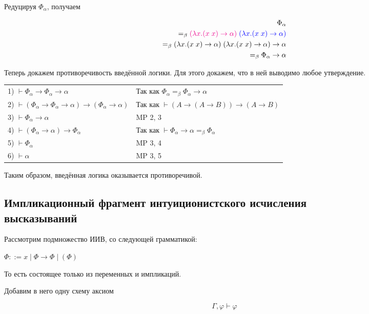 Редуцируя $\Phi_{\alpha}$, получаем 

\begin{align*}
\Phi_{\alpha} \\ =_{\beta} \textcolor{magenta}{(\lambda x. (x \; x) \rightarrow \alpha)} \; \textcolor{blue}{(\lambda x. (x \; x) \rightarrow \alpha)} \\=_{\beta} (\lambda x. (x \; x) \rightarrow \alpha) \; (\lambda x. (x \; x) \rightarrow \alpha) \rightarrow \alpha \\=_{\beta} \Phi_{\alpha} \rightarrow \alpha
\end{align*}

Теперь докажем противоречивость введённой логики. Для этого докажем, что в ней выводимо любое утверждение.

\begin{tabular}{ll}
	1) $\vdash\Phi_\alpha\rightarrow\Phi_\alpha\rightarrow\alpha$ & Так как $\Phi_{\alpha} =_{\beta} \Phi_{\alpha} \rightarrow \alpha$\\
	2) $\vdash(\Phi_\alpha\rightarrow\Phi_\alpha\rightarrow\alpha)\rightarrow(\Phi_\alpha\rightarrow\alpha)$ & Так как $\vdash (A \rightarrow (A \rightarrow B)) \rightarrow (A \rightarrow B)$\\
	3) $\vdash\Phi_\alpha\rightarrow\alpha$ & MP 2, 3\\
	4) $\vdash (\Phi_\alpha \rightarrow \alpha) \rightarrow \Phi_\alpha$ & Так как $\vdash \Phi_\alpha \rightarrow \alpha =_{\beta} \Phi_\alpha$\\
	5) $\vdash\Phi_\alpha$ & MP 3, 4\\
	6) $\vdash\alpha$ & MP 3, 5
\end{tabular}

Таким образом, введённая логика оказывается противоречивой.

\subsection{Импликационный фрагмент интуиционистского исчисления \\высказываний}

Рассмотрим подмножество ИИВ, со следующей грамматикой:

$\Phi ::= x \; | \; \Phi \rightarrow \Phi \; | \; (\Phi)$

То есть состоящее только из переменных и импликаций. 

Добавим в него одну схему аксиом

$$\Gamma, \varphi \vdash \varphi$$

